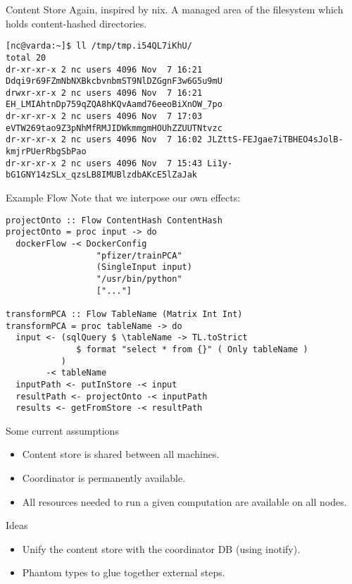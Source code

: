 \documentclass[11pt]{beamer}
\begin{document}
\begin{frame}[fragile]{Content Store}
Again, inspired by nix. A managed area of the filesystem which holds content-hashed directories.
\begin{lstlisting}[basicstyle=\tiny]
[nc@varda:~]$ ll /tmp/tmp.i54QL7iKhU/
total 20
dr-xr-xr-x 2 nc users 4096 Nov  7 16:21 Ddqi9r69FZmNbNXBkcbvnbmST9NlDZGgnF3w6G5u9mU
drwxr-xr-x 2 nc users 4096 Nov  7 16:21 EH_LMIAhtnDp759qZQA8hKQvAamd76eeoBiXnOW_7po
dr-xr-xr-x 2 nc users 4096 Nov  7 17:03 eVTW269tao9Z3pNhMfRMJIDWkmmgmHOUhZZUUTNtvzc
dr-xr-xr-x 2 nc users 4096 Nov  7 16:02 JLZttS-FEJgae7iTBHEO4sJolB-kmjrPUerRbgSbPao
dr-xr-xr-x 2 nc users 4096 Nov  7 15:43 Li1y-bG1GNY14zSLx_qzsLB8IMUBlzdbAKcE5lZaJak

\end{lstlisting}
\end{frame}

\begin{frame}[fragile]{Example Flow}
Note that we interpose our own effects:
\begin{lstlisting}[basicstyle=\tiny]
projectOnto :: Flow ContentHash ContentHash
projectOnto = proc input -> do
  dockerFlow -< DockerConfig
                  "pfizer/trainPCA"
                  (SingleInput input)
                  "/usr/bin/python"
                  ["..."]

transformPCA :: Flow TableName (Matrix Int Int)
transformPCA = proc tableName -> do
  input <- (sqlQuery $ \tableName -> TL.toStrict
              $ format "select * from {}" ( Only tableName )
           )
        -< tableName
  inputPath <- putInStore -< input
  resultPath <- projectOnto -< inputPath
  results <- getFromStore -< resultPath
\end{lstlisting}
\end{frame}

\begin{frame}{Some current assumptions}
\begin{itemize}
\item Content store is shared between all machines.
\item Coordinator is permanently available.
\item All resources needed to run a given computation are available on all nodes.
\end{itemize}
\end{frame}

\begin{frame}{Ideas}
\begin{itemize}
\item Unify the content store with the coordinator DB (using inotify).
\item Phantom types to glue together external steps.
\end{itemize}
\end{frame}
\end{document}
